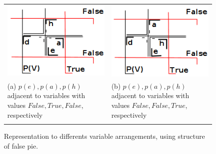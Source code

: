 \begin{figure}[h]
  \centering
  \begin{tabular}{ p{6cm} p{6cm} }
   \includegraphics[width=6cm, left]{./img/clausulaGadgetDisposicoesefathf.png} & \includegraphics[width=6cm, left]{./img/clausulaGadgetDisposicoesefafht.png}
    \\
    \footnotesize \centering (a) $p(e), p(a), p(h)$ adjacent to variables with values $False, True,False$, respectively \label{fig:disposicao1} & \footnotesize(b) $p(e), p(a), p(h)$ adjacent to variables with values $False,False, True$, respectively \label{fig:disposicao2} \\
&  \\ 
  \end{tabular}

 \caption{Representation to differents variable arrangements, using structure of false pie.} \label{fig:disposicoes}
\end{figure} 